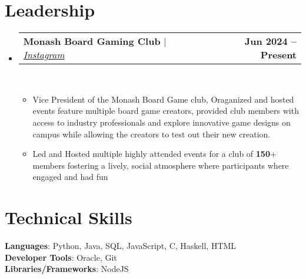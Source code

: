\documentclass[letterpaper,11pt]{article}
\makeatletter
\newcommand{\resumeItem}[1]{
  \item\small{
    {#1 \vspace{0pt}}
  }
}
\newcommand{\resumeProjectHeading}[2]{
    \item
    \begin{tabular*}{1.001\textwidth}{l@{\extracolsep{\fill}}r}
      \small#1 & \textbf{\small #2}\\
    \end{tabular*}\vspace{-7pt}
}
\newcommand{\resumeSubHeadingListStart}{\begin{itemize}[leftmargin=0.0in, label={}]}
\newcommand{\resumeSubHeadingListEnd}{\end{itemize}}\vspace{0pt}
\newcommand{\resumeItemListStart}{\begin{itemize}}
\newcommand{\resumeItemListEnd}{\end{itemize}\vspace{-5pt}}
\makeatother
\begin{document}
\section{Leadership} 
    \vspace{-5pt}
    \resumeSubHeadingListStart
                   \resumeProjectHeading
            {\textbf{{Monash Board Gaming Club }} $|$\emph{\href{https://www.instagram.com/monashboardgaming/}{ Instagram}}}{Jun 2024 -- Present}
            \\[5mm]
          \resumeItemListStart
            \resumeItem{Vice President of the Monash Board Game club, Oraganized and hosted events feature multiple board game creators, provided club members with access to industry professionals and explore innovative game designs on campus while allowing the creators to test out their new creation.}
            \resumeItem{Led and Hosted multiple highly attended events for a club of \textbf{150}+ members fostering a lively, social atmosphere where participants where engaged and had fun}
          \resumeItemListEnd
          \resumeSubHeadingListEnd
 \vspace{-12pt}
\section{Technical Skills}
 \begin{itemize}[leftmargin=0.15in, label={}]
    \small{\item{   
     \textbf{Languages}{: Python, Java, SQL, JavaScript, C, Haskell, HTML} \\[1mm]
     \textbf{Developer Tools}{: Oracle, Git} \\[1mm]
     \textbf{Libraries/Frameworks}{: NodeJS } \\ [1mm]
    }}
 \end{itemize}
 \vspace{-16pt}
 \vspace{3pt}
\vspace{10pt}

\vspace{-15pt}
\end{document}
